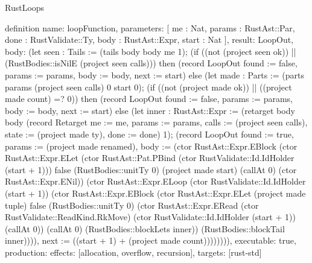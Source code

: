 \begin{lexlean}{RustLoops}
\begin{semanticmodule}
definition{
  name: loopFunction,
  parameters: [
    me : Nat,
    params : RustAst::Par,
    done : RustValidate::Ty,
    body : RustAst::Expr,
    start : Nat
  ],
  result: LoopOut,
  body: (let seen : Tails := (tails body body me 1); (if ((not (project seen ok)) || (RustBodies::isNilE (project seen calls))) then (record LoopOut {found := false, params := params, body := body, next := start}) else (let made : Parts := (parts params (project seen calls) 0 start 0); (if ((not (project made ok)) || ((project made count) =? 0)) then (record LoopOut {found := false, params := params, body := body, next := start}) else (let inner : RustAst::Expr := (retarget body body (record Retarget {me := me, params := params, calls := (project seen calls), state := (project made ty), done := done}) 1); (record LoopOut {found := true, params := (project made renamed), body := (ctor RustAst::Expr.EBlock (ctor RustAst::Expr.ELet (ctor RustAst::Pat.PBind (ctor RustValidate::Id.IdHolder (start + 1))) false (RustBodies::unitTy 0) (project made start) (callAt 0) (ctor RustAst::Expr.ENil)) (ctor RustAst::Expr.ELoop (ctor RustValidate::Id.IdHolder (start + 1)) (ctor RustAst::Expr.EBlock (ctor RustAst::Expr.ELet (project made tuple) false (RustBodies::unitTy 0) (ctor RustAst::Expr.ERead (ctor RustValidate::ReadKind.RkMove) (ctor RustValidate::Id.IdHolder (start + 1)) (callAt 0)) (callAt 0) (RustBodies::blockLets inner)) (RustBodies::blockTail inner)))), next := ((start + 1) + (project made count))})))))),
  executable: true,
  production: {effects: [allocation, overflow, recursion], targets: [rust-std]}
}
\end{semanticmodule}
\end{lexlean}
